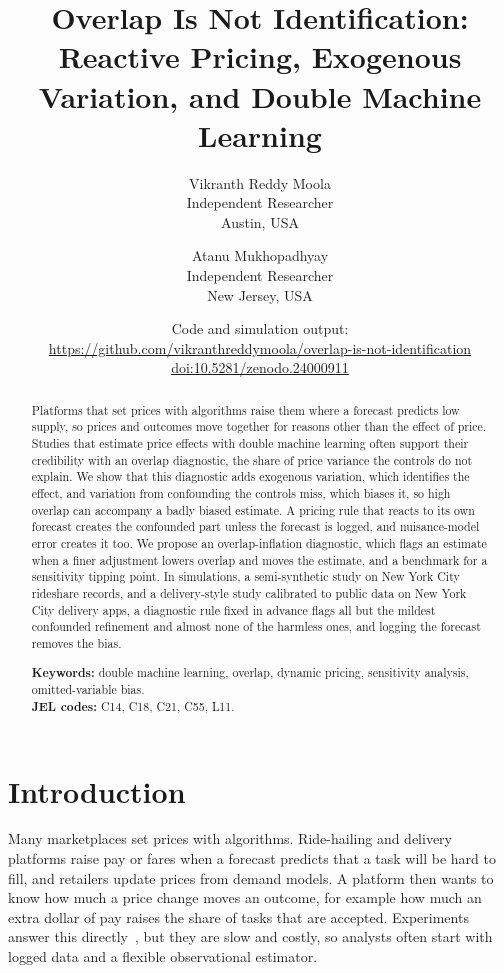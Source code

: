 \documentclass[11pt]{article}
\title{Overlap Is Not Identification: Reactive Pricing, Exogenous Variation, and Double Machine Learning}
\author{Vikranth Reddy Moola\\ {\small Independent Researcher}\\ {\small Austin, USA}
\and Atanu Mukhopadhyay\\ {\small Independent Researcher}\\ {\small New Jersey, USA}}
\date{\small Code and simulation output:\\ \url{https://github.com/vikranthreddymoola/overlap-is-not-identification}\\ \href{https://doi.org/10.5281/zenodo.24000911}{doi:10.5281/zenodo.24000911}}
\theoremstyle{remark}
\begin{document}
\maketitle

\begin{abstract}
Platforms that set prices with algorithms raise them where a forecast predicts low supply, so prices and outcomes move together for reasons other than the effect of price. Studies that estimate price effects with double machine learning often support their credibility with an overlap diagnostic, the share of price variance the controls do not explain. We show that this diagnostic adds exogenous variation, which identifies the effect, and variation from confounding the controls miss, which biases it, so high overlap can accompany a badly biased estimate. A pricing rule that reacts to its own forecast creates the confounded part unless the forecast is logged, and nuisance-model error creates it too. We propose an overlap-inflation diagnostic, which flags an estimate when a finer adjustment lowers overlap and moves the estimate, and a benchmark for a sensitivity tipping point. In simulations, a semi-synthetic study on New York City rideshare records, and a delivery-style study calibrated to public data on New York City delivery apps, a diagnostic rule fixed in advance flags all but the mildest confounded refinement and almost none of the harmless ones, and logging the forecast removes the bias.

\medskip
\noindent\textbf{Keywords:} double machine learning, overlap, dynamic pricing, sensitivity analysis, omitted-variable bias.\\
\textbf{JEL codes:} C14, C18, C21, C55, L11.
\end{abstract}

\section{Introduction}

Many marketplaces set prices with algorithms. Ride-hailing and delivery platforms raise pay or fares when a forecast predicts that a task will be hard to fill, and retailers update prices from demand models. A platform then wants to know how much a price change moves an outcome, for example how much an extra dollar of pay raises the share of tasks that are accepted. Experiments answer this directly~\citep{bojinov2023}, but they are slow and costly, so analysts often start with logged data and a flexible observational estimator.
\end{document}
